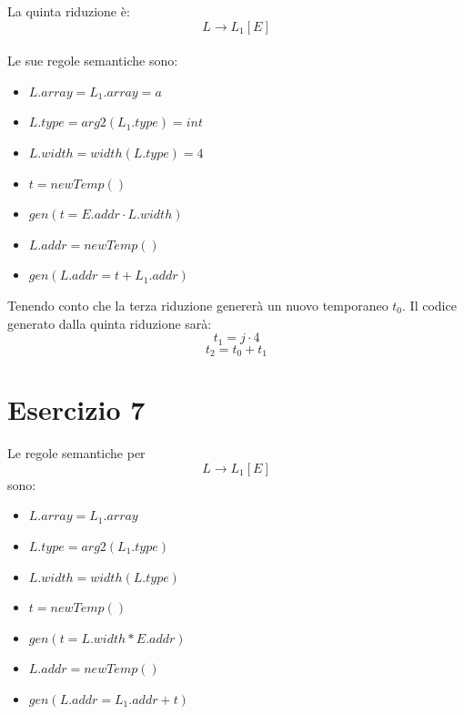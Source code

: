 \documentclass[11pt]{article}
\begin{document}
\begin{center}
\begin{minipage}[t]{\linewidth}
\begin{multicols}{2}
\begin{figure}[H]
      \end{figure}
      La quinta riduzione è: $$L \rightarrow L_1[E]$$
      \\Le sue regole semantiche sono: 
      \begin{itemize}
        \item $L.array = L_1.array = a$
        \item $L.type = arg2(L_1.type) = int$
        \item $L.width = width(L.type) = 4$
        \item $t = newTemp()$
        \item $gen(t=E.addr\cdot L.width)$
        \item $L.addr = newTemp()$
        \item $gen(L.addr = t + L_1.addr)$ 
      \end{itemize}
      Tenendo conto che la terza riduzione genererà un nuovo temporaneo $t_0$. 
      Il codice generato dalla quinta riduzione sarà:$$t_1 = j \cdot 4$$ $$t_2 = t_0 + t_1$$
    \end{multicols}
  \end{minipage}
\end{center}
\section*{Esercizio 7}
Le regole semantiche per $$L \rightarrow L_1[E]$$ sono:
\begin{itemize}
  \item $L.array = L_1.array$
  \item $L.type = arg2(L_1.type)$
  \item $L.width = width(L.type)$
  \item $t = newTemp()$
  \item $gen(t = L.width * E.addr)$
  \item $L.addr = newTemp()$
  \item $gen(L.addr = L_1.addr + t)$
\end{itemize}
\newpage
\end{document}
